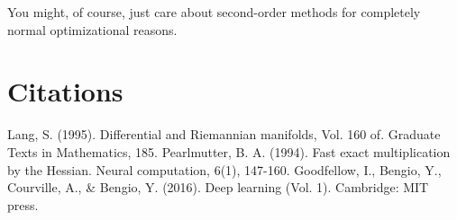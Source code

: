 \documentclass{article}
\begin{document}
You might, of course, just care about second-order methods for completely normal optimizational reasons.

\section{Citations}

\begin{thebibliography}{9}
Lang, S. (1995). Differential and Riemannian manifolds, Vol. 160 of. Graduate Texts in Mathematics, 185.
Pearlmutter, B. A. (1994). Fast exact multiplication by the Hessian. Neural computation, 6(1), 147-160.
Goodfellow, I., Bengio, Y., Courville, A., \& Bengio, Y. (2016). Deep learning (Vol. 1). Cambridge: MIT press.
\end{thebibliography}
\end{document}
